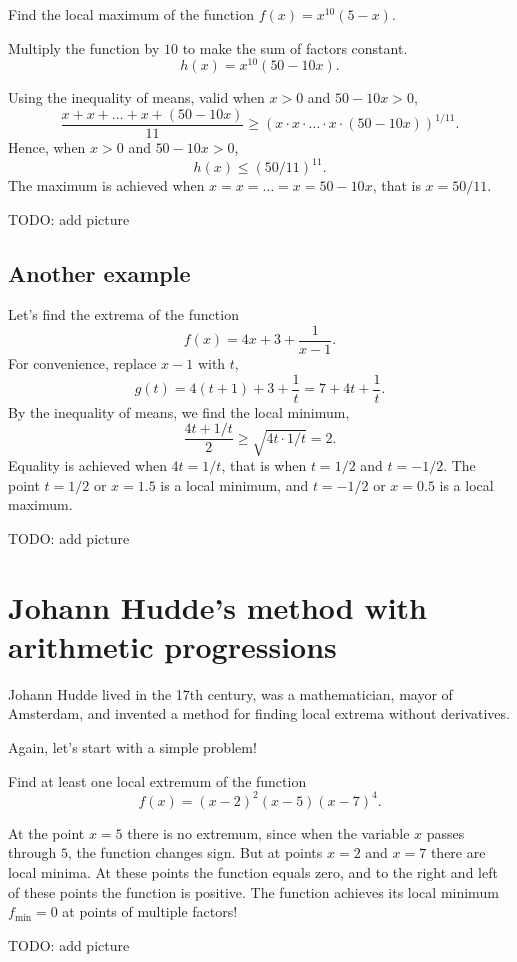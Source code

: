 \documentclass[12pt]{article}
\begin{document}
Find the local maximum of the function $f(x) = x^{10} (5 - x)$.

Multiply the function by $10$ to make the sum of factors constant.
\[
h(x) = x^{10}(50 - 10x).
\]

Using the inequality of means, valid when $x > 0$ and $50 - 10x > 0$,
\[
\frac{x + x + \dots + x + (50 - 10x)}{11} \geq (x \cdot x \cdot \dots \cdot x \cdot (50 - 10x) )^{1/11}.
\]
Hence, when $x > 0$ and $50 - 10x > 0$,
\[
h(x) \leq (50/11)^{11}.
\]
The maximum is achieved when $x = x = \dots = x = 50 - 10x$, that is $x = 50/11$.

TODO: add picture

\subsection*{Another example}

Let's find the extrema of the function 
\[
f(x) = 4x + 3 + \frac{1}{x - 1}.
\]
For convenience, replace $x - 1$ with $t$,
\[
g(t) = 4(t + 1) + 3 + \frac{1}{t} = 7 + 4t + \frac{1}{t}.
\]
By the inequality of means, we find the local minimum,
\[
\frac{4t + 1/t}{2} \geq \sqrt{4t \cdot 1/t} = 2.
\]
Equality is achieved when $4t = 1/t$, that is when $t = 1/2$ and $t = -1/2$.
The point $t=1/2$ or $x = 1.5$ is a local minimum, and $t = -1/2$ or $x = 0.5$ is a local maximum.


TODO: add picture


\section{Johann Hudde's method with arithmetic progressions}

Johann Hudde lived in the 17th century, was a mathematician, mayor of Amsterdam, and invented a method for finding local extrema without derivatives. 

Again, let's start with a simple problem!

Find at least one local extremum of the function
\[
f(x)  = (x - 2)^2 (x - 5) (x - 7)^4.
\]

At the point $x=5$ there is no extremum, since when the variable $x$ passes through $5$, the function changes sign. 
But at points $x = 2$ and $x = 7$ there are local minima. 
At these points the function equals zero, and to the right and left of these points the function is positive. 
The function achieves its local minimum $f_{\text{min}} = 0$ at points of multiple factors!


TODO: add picture
\end{document}
